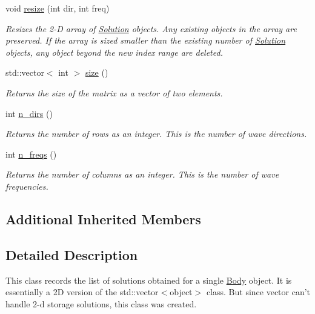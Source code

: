 \begin{DoxyCompactItemize}
void \hyperlink{classosea_1_1ofreq_1_1_solution_set_a1f01e0b7d5b72c8b225f15dc8d921315}{resize} (int dir, int freq)
\begin{DoxyCompactList}\small\item\em Resizes the 2-\/\-D array of \hyperlink{classosea_1_1ofreq_1_1_solution}{Solution} objects. Any existing objects in the array are preserved. If the array is sized smaller than the existing number of \hyperlink{classosea_1_1ofreq_1_1_solution}{Solution} objects, any object beyond the new index range are deleted. \end{DoxyCompactList}\item 
std\-::vector$<$ int $>$ \hyperlink{classosea_1_1ofreq_1_1_solution_set_a2484020f280cce582ae20f7631963adb}{size} ()
\begin{DoxyCompactList}\small\item\em Returns the size of the matrix as a vector of two elements. \end{DoxyCompactList}\item 
int \hyperlink{classosea_1_1ofreq_1_1_solution_set_a8cfe38b972cb389453a5251767c0defa}{n\-\_\-dirs} ()
\begin{DoxyCompactList}\small\item\em Returns the number of rows as an integer. This is the number of wave directions. \end{DoxyCompactList}\item 
int \hyperlink{classosea_1_1ofreq_1_1_solution_set_a03842750155f8eb60f1cc6ec46b8e85e}{n\-\_\-freqs} ()
\begin{DoxyCompactList}\small\item\em Returns the number of columns as an integer. This is the number of wave frequencies. \end{DoxyCompactList}\end{DoxyCompactItemize}
\subsection*{Additional Inherited Members}


\subsection{Detailed Description}
This class records the list of solutions obtained for a single \hyperlink{classosea_1_1ofreq_1_1_body}{Body} object. It is essentially a 2\-D version of the std\-::vector$<$object$>$ class. But since vector can't handle 2-\/d storage solutions, this class was created. 

